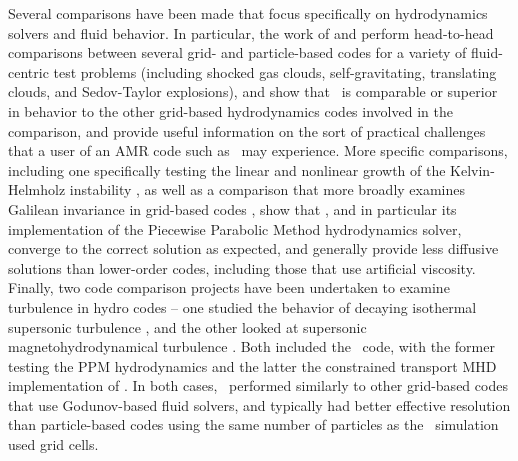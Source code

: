 Several comparisons have been made that focus specifically on
hydrodynamics solvers and fluid behavior.  In particular, the work of
\citet{2007MNRAS.380..963A} and \citet{Tasker2008} perform
head-to-head comparisons between several grid- and particle-based
codes for a variety of fluid-centric test problems (including shocked gas clouds,
self-gravitating, translating clouds, and Sedov-Taylor explosions),
and show that \enzo\ is comparable or superior in behavior to the
other grid-based hydrodynamics codes involved in the comparison, and
provide useful information on the sort of practical challenges that a
user of an
AMR code such as \enzo\ may experience.  More specific comparisons, including one
specifically testing the linear and nonlinear growth of the
Kelvin-Helmholz instability \citep{2012ApJS..201...18M}, as well as a
comparison that more
broadly examines Galilean invariance in grid-based codes
\citep{2010MNRAS.401.2463R}, show that \enzo, and in particular its
implementation of the Piecewise Parabolic Method hydrodynamics solver,
converge to the correct solution as expected, and generally provide
less diffusive solutions than lower-order codes, including those that
use artificial viscosity.  Finally, two code comparison projects have
been undertaken to examine turbulence in hydro codes -- one studied
the behavior of decaying isothermal supersonic turbulence
\citep{2009A&A...508..541K}, and the other looked at supersonic
magnetohydrodynamical turbulence \citep{2011ApJ...737...13K}.  Both
included the \enzo\ code, with the former testing the PPM
hydrodynamics and the latter the constrained transport MHD
implementation of \citet{Collins10}.  In both cases, \enzo\ performed similarly to other
grid-based codes that use Godunov-based fluid solvers, and typically
had better effective resolution than particle-based codes using the
same number of particles as the \enzo\ simulation used grid cells.

